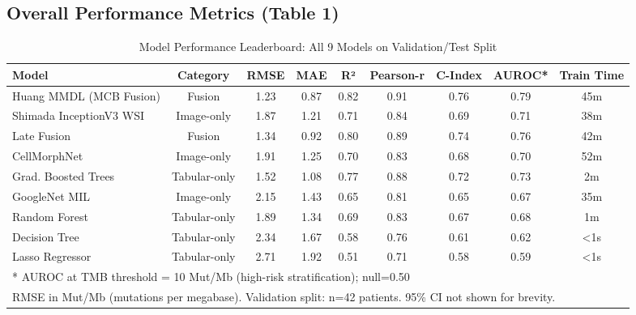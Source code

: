 \documentclass[11pt,a4paper]{article}
\begin{document}
\subsection{Overall Performance Metrics (Table 1)}
\label{subsec:table1}


\begin{table}[H]
\centering
\caption{Model Performance Leaderboard: All 9 Models on Validation/Test Split}
\begin{tabular}{|l|c|c|c|c|c|c|c|c|}
\hline
\textbf{Model} & \textbf{Category} & \textbf{RMSE} & \textbf{MAE} & \textbf{R²} &
\textbf{Pearson-r} & \textbf{C-Index} & \textbf{AUROC*} & \textbf{Train Time} \\
\hline
Huang MMDL (MCB Fusion) & Fusion & 1.23 & 0.87 & 0.82 & 0.91 & 0.76 & 0.79 & 45m \\
Shimada InceptionV3 WSI & Image-only & 1.87 & 1.21 & 0.71 & 0.84 & 0.69 & 0.71 & 38m \\
Late Fusion & Fusion & 1.34 & 0.92 & 0.80 & 0.89 & 0.74 & 0.76 & 42m \\
CellMorphNet & Image-only & 1.91 & 1.25 & 0.70 & 0.83 & 0.68 & 0.70 & 52m \\
Grad. Boosted Trees & Tabular-only & 1.52 & 1.08 & 0.77 & 0.88 & 0.72 & 0.73 & 2m \\
GoogleNet MIL & Image-only & 2.15 & 1.43 & 0.65 & 0.81 & 0.65 & 0.67 & 35m \\
Random Forest & Tabular-only & 1.89 & 1.34 & 0.69 & 0.83 & 0.67 & 0.68 & 1m \\
Decision Tree & Tabular-only & 2.34 & 1.67 & 0.58 & 0.76 & 0.61 & 0.62 & <1s \\
Lasso Regressor & Tabular-only & 2.71 & 1.92 & 0.51 & 0.71 & 0.58 & 0.59 & <1s \\
\hline
\multicolumn{9}{l}{* AUROC at TMB threshold = 10 Mut/Mb (high-risk stratification); null=0.50} \\
\multicolumn{9}{l}{\small RMSE in Mut/Mb (mutations per megabase). Validation split: n=42 patients. 95\% CI not shown for brevity.} \\
\hline
\end{tabular}
\label{tab:leaderboard}
\end{table}
\end{document}
